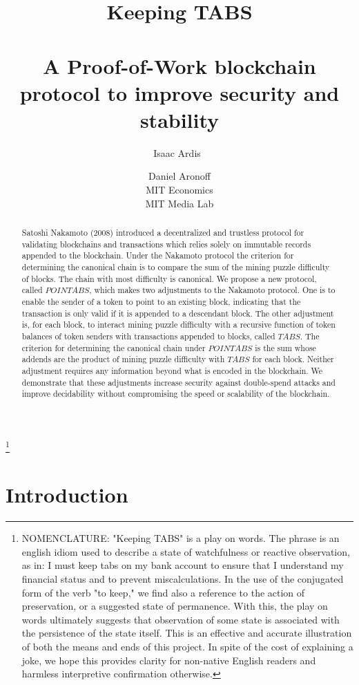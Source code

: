 \documentclass[11pt]{article}
\title{\textbf{Keeping TABS}\\~\\

\small{A Proof-of-Work blockchain protocol to improve security and stability }}
\author{Isaac Ardis\
\and Daniel Aronoff\\\small{MIT Economics}\\\small{MIT Media Lab}}
\theoremstyle{plain}
\begin{document}
\maketitle
\begin{abstract}
Satoshi Nakamoto (2008) introduced a decentralized and trustless protocol for validating blockchains and transactions which relies solely on immutable records appended to the blockchain. Under the Nakamoto protocol the criterion for determining the canonical chain is to compare the sum of the mining puzzle difficulty of blocks. The chain with most difficulty is canonical. We propose a new protocol, called $POINTABS$, which makes two adjustments to the Nakamoto protocol. One is to enable the sender of a token to point to an existing block, indicating that the transaction is only valid if it is appended to a descendant block. The other adjustment is, for each block, to interact mining puzzle difficulty with a recursive function of token balances of token senders with transactions appended to blocks, called $TABS$. The criterion for determining the canonical chain under $POINTABS$ is the sum whose addends are the product of mining puzzle difficulty with $TABS$ for each block. Neither adjustment requires any information beyond what is encoded in the blockchain. We demonstrate that these adjustments increase security against double-spend attacks and improve decidability without compromising the speed or scalability of the blockchain.

\end{abstract}
\footnote{ NOMENCLATURE: "Keeping TABS" is a play on words. The phrase is an english idiom used to describe a state of watchfulness or reactive observation, as in: I must keep tabs on my bank account to ensure that I understand my financial status and to prevent miscalculations. In the use of the conjugated form of the verb "to keep," we find also a reference to the action of preservation, or a suggested state of permanence. With this, the play on words ultimately suggests that observation of some state is associated with the persistence of the state itself. This is an effective and accurate illustration of both the means and ends of this project. In spite of the cost of explaining a joke, we hope this provides clarity for non-native English readers and harmless interpretive confirmation otherwise.}

\section{\normalsize{Introduction}}
\end{document}
